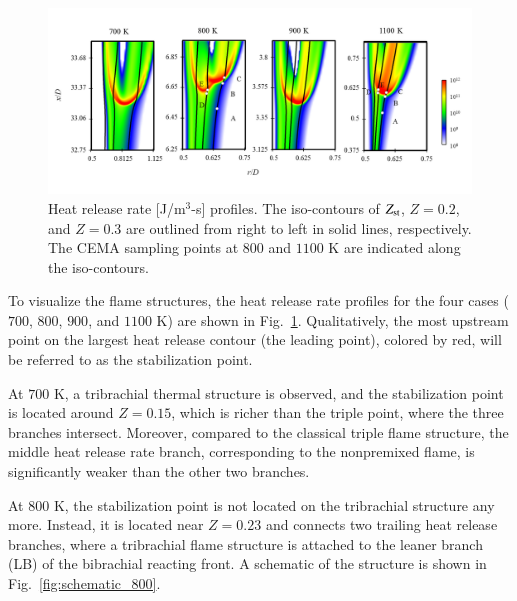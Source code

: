 \documentclass[review,3p,times]{elsarticle}
\begin{document}
\begin{figure}[t]
  \centering
  \scriptsize
  \vspace{-0.1in}
  \includegraphics[width=1.0\textwidth]{HRR.png}
  \normalsize
  \vspace{-0.1in}
  \caption{Heat release rate [J/m$^3$-s] profiles.  The iso-contours of $Z_{\rm st}$, $Z = 0.2$, and $Z = 0.3$ are outlined from right to left in solid lines, respectively.  The CEMA sampling points at $800$ and $1100$ K are indicated along the iso-contours.}
  \label{fig:HRR}
\end{figure}

To visualize the flame structures, the heat release rate profiles for the four cases ($700$, $800$, $900$, and $1100$ K) are shown in Fig.~\ref{fig:HRR}.  Qualitatively, the most upstream point on the largest heat release contour (the leading point), colored by red, will be referred to as the stabilization point.  

At $700$ K, a tribrachial thermal structure is observed, and the stabilization point is located around $Z = 0.15$, which is richer than the triple point, where the three branches intersect.  Moreover, compared to the classical triple flame structure, the middle heat release rate branch, corresponding to the nonpremixed flame, is significantly weaker than the other two branches.  

At $800$ K, the stabilization point is not located on the tribrachial structure any more.  Instead, it is located near $Z = 0.23$ and connects two trailing heat release branches, where a tribrachial flame structure is attached to the leaner branch (LB) of the bibrachial reacting front.  A schematic of the structure is shown in Fig.~\ref{fig:schematic_800}.
\end{document}
